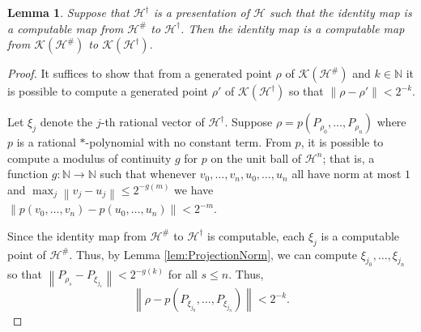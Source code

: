 \documentclass{amsart}
\newcommand{\N}{\mathbb{N}}
\newcommand{\norm}[1]{\left\| #1 \right\|}
\newcommand{\calH}{\mathcal{H}}
\theoremstyle{plain}
\newtheorem{lemma}[theorem]{Lemma}
\theoremstyle{definition}
\numberwithin{equation}{section}
\begin{document}
\begin{lemma}\label{lem:IdentityMapLift}
Suppose that $\mathcal{H}^\dagger$ is a presentation of $\mathcal{H}$ such that the identity map is a computable map from $\mathcal{H}^\#$ to $\mathcal{H}^\dagger$.  Then the identity map is a computable map from $\mathcal{K}(\mathcal{H}^\#)$ to $\mathcal{K}(\mathcal{H}^\dagger)$.
\end{lemma}
\begin{proof} 
It suffices to show that from a generated point $\rho$ of $\mathcal{K}(\calH^\#)$ and $k \in \N$ it is possible to compute 
a generated point $\rho'$ of $\mathcal{K}(\calH^\dagger)$ so that $\norm{\rho - \rho'} < 2^{-k}$. 

Let $\xi_j$ denote the $j$-th rational vector of $\calH^\dagger$. 
Suppose $\rho = p(P_{\rho_0}, \ldots, P_{\rho_n})$ where $p$ is a rational $*$-polynomial with no constant term.  
From $p$, it is possible to compute a modulus of continuity $g$ for $p$ on the unit ball of $\calH^n$; that is, a function $g : \mathbb{N} \to \mathbb{N}$ such that whenever $v_0, \ldots, v_n, u_0, \ldots, u_n$ all have norm at most $1$ and $\max_j \norm{v_j - u_j} \leq 2^{-g(m)}$ we have $\norm{p(v_0, \ldots, v_n) - p(u_0, \ldots, u_n)} < 2^{-m}$. 

Since the identity map from $\mathcal{H}^\#$ to $\mathcal{H}^\dagger$ is computable, each $\xi_j$ is a computable point of $\mathcal{H}^\#$. Thus, by Lemma \ref{lem:ProjectionNorm}, we can compute $\xi_{j_0}, \ldots, \xi_{j_n}$ so that 
$\norm{P_{\rho_s} - P_{\xi_{j_s}}} < 2^{-g(k)}$ for all $s \leq n$.  
Thus,
\[\norm{\rho - p(P_{\xi_{j_0}}, \ldots, P_{\xi_{j_n}})} < 2^{-k}.\]
\end{proof}
\end{document}
